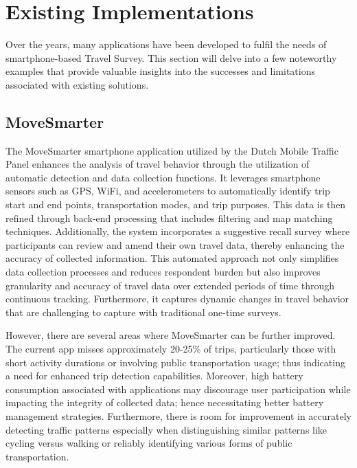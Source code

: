 \documentclass[12pt,two side]{report}
\begin{document}
\section{Existing Implementations}
Over the years, many applications have been developed to fulfil the needs of smartphone-based Travel Survey. This section will delve into a few noteworthy examples that provide valuable insights into the successes and limitations associated with existing solutions.
\subsection{MoveSmarter}
The MoveSmarter smartphone application utilized by the Dutch Mobile Traffic Panel enhances the analysis of travel behavior through the utilization of automatic detection and data collection functions. It leverages smartphone sensors such as GPS, WiFi, and accelerometers to automatically identify trip start and end points, transportation modes, and trip purposes. This data is then refined through back-end processing that includes filtering and map matching techniques\cite{geurs2015automatic}. Additionally, the system incorporates a suggestive recall survey where participants can review and amend their own travel data, thereby enhancing the accuracy of collected information. This automated approach not only simplifies data collection processes and reduces respondent burden but also improves granularity and accuracy of travel data over extended periods of time through continuous tracking. Furthermore, it captures dynamic changes in travel behavior\cite{geurs2015automatic} that are challenging to capture with traditional one-time surveys.\newline


However, there are several areas where MoveSmarter can be further improved. The current app misses approximately 20-25\% of trips, particularly those with short activity durations or involving public transportation usage; thus indicating a need for enhanced trip detection capabilities\cite{geurs2015automatic}. Moreover, high battery consumption associated with applications may discourage user participation while impacting the integrity of collected data; hence necessitating better battery management strategies\cite{geurs2015automatic}. Furthermore, there is room for improvement in accurately detecting traffic patterns especially when distinguishing similar patterns like cycling versus walking or reliably identifying various forms of public transportation\cite{geurs2015automatic}.
\end{document}
